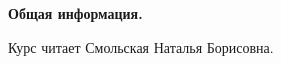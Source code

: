 \documentclass[main.tex]{subfiles}
\begin{document}
\textbf{Общая информация.}

Курс читает Смольская Наталья Борисовна.
\end{document}
